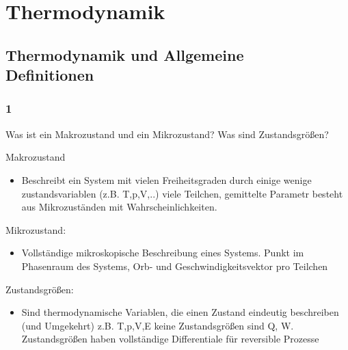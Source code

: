 \documentclass[12pt,a4paper]{report}
\author{\theauthor}
\title{\thetitle}
\newenvironment{myfrag}{\begin{it}}{\end{it}\vspace{3mm}\par}
\numberwithin{equation}{section}
\begin{document}
\maketitle%
\begin{abstract}
Die vorliegende Fragensammlung besteht aus den mit den Übungsblättern verteilten Verständ-nisfragen zur Vorlesung "Thermodynamik und Statistik" (früher "Statistische Mechanik") aus dem Sommersemester 2014 von Prof. Eggert, TU Kaiserslautern.\\
Sie wurde als Hilfsmittel zur Klausur- und Prüfungsvorbereitung von Studenten für Studenten geschrieben und keineswegs fehlerfrei, eventuelle inhaaltliche Fehler werden aber gerne korrigiert. Rechschreibfehler dürfen vom Finder behalten werden.
\end{abstract}
\tableofcontents%
\chapter{Thermodynamik}
\section{Thermodynamik und Allgemeine\\Definitionen}
\subsection{1}
\begin{myfrag}
Was ist ein Makrozustand und ein Mikrozustand?
Was sind Zustandsgrößen?
\end{myfrag} \qquad \newline
Makrozustand 
\begin{itemize}
\item Beschreibt ein System mit vielen Freiheitsgraden durch einige wenige zustandsvariablen (z.B. T,p,V,..) viele Teilchen, gemittelte Parametr besteht aus Mikrozuständen mit Wahrscheinlichkeiten.
\end{itemize}
Mikrozustand:
\begin{itemize}
\item Vollständige mikroskopische Beschreibung eines Systems. Punkt im Phasenraum des Systems, Orb- und Geschwindigkeitsvektor pro Teilchen
\end{itemize}
Zustandsgrößen:
\begin{itemize}
\item Sind thermodynamische Variablen, die einen Zustand eindeutig beschreiben (und Umgekehrt) z.B. T,p,V,E keine Zustandsgrößen sind Q, W. Zustandsgrößen haben vollständige Differentiale für reversible Prozesse
\end{itemize}
\end{document}
